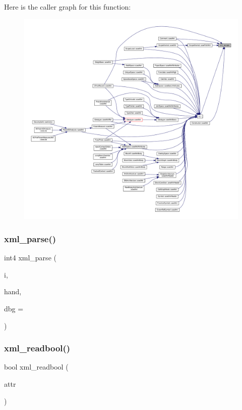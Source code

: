 Here is the caller graph for this function\+:
\nopagebreak
\begin{figure}[H]
\begin{center}
\leavevmode
\includegraphics[width=350pt]{xml_8hh_a18ba74ef06228bed0b1eff1f1abbb7ef_icgraph}
\end{center}
\end{figure}
\mbox{\label{xml_8hh_acb2e6147fb537978820f563506f8e0ff}} 
\subsubsection{\texorpdfstring{xml\_parse()}{xml\_parse()}}
{\footnotesize\ttfamily int4 xml\+\_\+parse (\begin{DoxyParamCaption}\item[{istream \&}]{i,  }\item[{\mbox{\hyperlink{class_content_handler}{Content\+Handler}} $\ast$}]{hand,  }\item[{int4}]{dbg = {} }\end{DoxyParamCaption})}

\mbox{\label{xml_8hh_ac2d01d7c2986f1143b2f6145311d093e}} 
\subsubsection{\texorpdfstring{xml\_readbool()}{xml\_readbool()}}
{\footnotesize\ttfamily bool xml\+\_\+readbool (\begin{DoxyParamCaption}\item[{const string \&}]{attr }\end{DoxyParamCaption})\hspace{0.3cm}{\ttfamily [inline]}}



